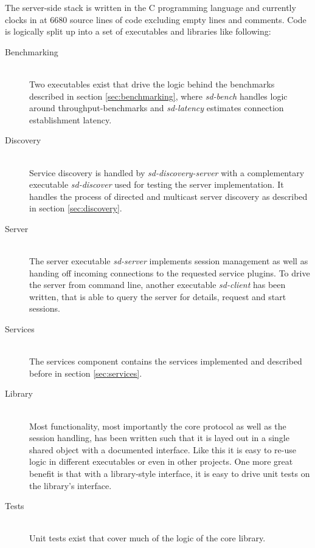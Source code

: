 The server-side stack is written in the C programming language and currently clocks in at 6680 source lines of code excluding empty lines and comments.
Code is logically split up into a set of executables and libraries like following:
\begin{description}
    \item[Benchmarking]\hfill\\
        Two executables exist that drive the logic behind the benchmarks described in section \ref{sec:benchmarking}, where \emph{sd-bench} handles logic around throughput-benchmarks and \emph{sd-latency} estimates connection establishment latency.
    \item[Discovery]\hfill\\
        Service discovery is handled by \emph{sd-discovery-server} with a complementary executable \emph{sd-discover} used for testing the server implementation.
        It handles the process of directed and multicast server discovery as described in section \ref{sec:discovery}.
    \item[Server]\hfill\\
        The server executable \emph{sd-server} implements session management as well as handing off incoming connections to the requested service plugins.
        To drive the server from command line, another executable \emph{sd-client} has been written, that is able to query the server for details, request and start sessions.
    \item[Services]\hfill\\
        The services component contains the services implemented and described before in section \ref{sec:services}.
    \item[Library]\hfill\\
        Most functionality, most importantly the core protocol as well as the session handling, has been written such that it is layed out in a single shared object with a documented interface.
        Like this it is easy to re-use logic in different executables or even in other projects.
        One more great benefit is that with a library-style interface, it is easy to drive unit tests on the library's interface.
    \item[Tests]\hfill\\
        Unit tests exist that cover much of the logic of the core library.
\end{description}

